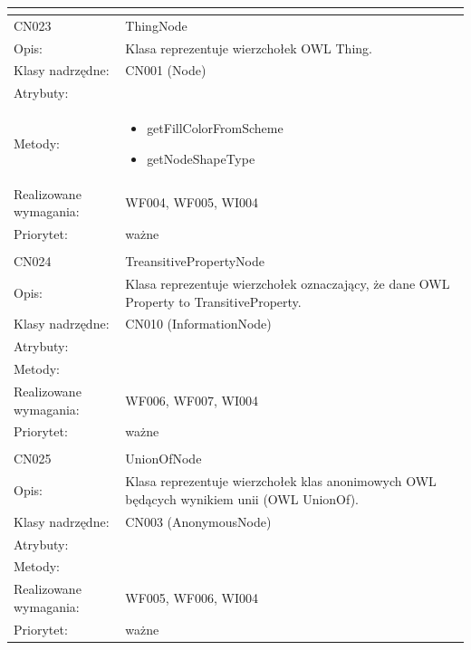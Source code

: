 \documentclass[a4paper,10pt]{article}
\begin{document}
\begin{center}
\begin{longtable}{|m{3cm}|m{9cm}|}
\multicolumn{2}{c}{} \\
 \hline

CN023 & ThingNode \\ \hline
Opis: & Klasa reprezentuje wierzchołek OWL Thing.    \\ \hline
Klasy nadrzędne: & CN001 (Node)       \\ \hline
Atrybuty: & %
 \\ \hline
Metody: & \begin{itemize}
 \item getFillColorFromScheme
 \item getNodeShapeType
\end{itemize}
  \\ \hline
Realizowane wymagania: & WF004, WF005, WI004 \\ \hline
Priorytet: & ważne  \\ \hline

\multicolumn{2}{c}{} \\
 \hline

CN024 & TreansitivePropertyNode \\ \hline
Opis: & Klasa reprezentuje wierzchołek oznaczający, że dane OWL Property to TransitiveProperty.    \\ \hline
Klasy nadrzędne: & CN010 (InformationNode)     \\ \hline
Atrybuty: & %
 \\ \hline
Metody: & %
  \\ \hline
Realizowane wymagania: & WF006, WF007, WI004 \\ \hline
Priorytet: & ważne  \\ \hline

\multicolumn{2}{c}{} \\
 \hline

CN025 & UnionOfNode \\ \hline
Opis: & Klasa reprezentuje wierzchołek klas anonimowych OWL będących wynikiem unii (OWL UnionOf).    \\ \hline
Klasy nadrzędne: & CN003 (AnonymousNode)     \\ \hline
Atrybuty: & %
 \\ \hline
Metody: & %
  \\ \hline
Realizowane wymagania: & WF005, WF006, WI004 \\ \hline
Priorytet: & ważne  \\ \hline


\end{longtable}
\end{center}
\end{document}
